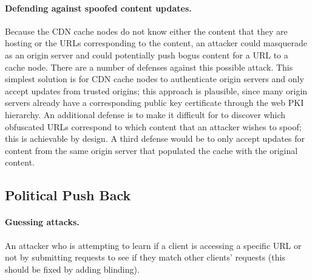 \paragraph{Defending against spoofed content updates.} Because the CDN cache
nodes do not know either the content that they are hosting or the URLs
corresponding to the content, an attacker could masquerade as an origin server
and could potentially push bogus content for a URL to a cache node. There are
a number of defenses against this possible attack. This simplest solution is
for CDN cache nodes to authenticate origin servers and only accept updates
from trusted origins; this approach is plausible, since many origin servers already
have a corresponding public key certificate through the web PKI hierarchy.  An additional
defense is to make it difficult for to discover which obfuscated URLs correspond
to which content that an attacker wishes to spoof; this is achievable by design.
A third defense would be to only accept updates for content from the same origin
server that populated the cache with the original content.

\subsection{Political Push Back}


\paragraph{Guessing attacks.}
An attacker who is attempting to learn if a client is accessing a specific URL or not by submitting requests to see if they match other clients' requests (this should be fixed by adding blinding).
